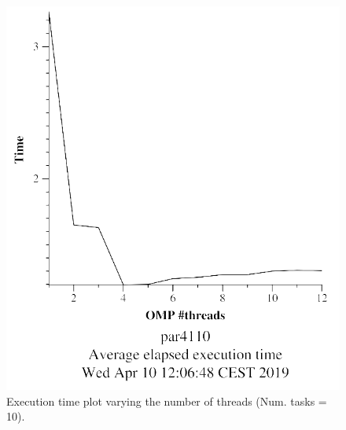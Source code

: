 \documentclass[12pt, a4paper]{article}
\begin{document}
\begin{figure}[H]
\centering
\begin{minipage}[b]{0.4\linewidth}
  \centering
  \includegraphics[scale=0.5]{./mandel-omp-10000-strong-omp-3-10-time}
  \caption{Execution time plot varying the number of threads (Num. tasks = 10).}
  \label{fig:mandel-omp-10000-strong-omp-3-10-time}
\end{minipage}%
\hspace{0.5cm}
\begin{minipage}[b]{0.4\linewidth}
  \centering

\end{minipage}
\end{figure}
\end{document}
